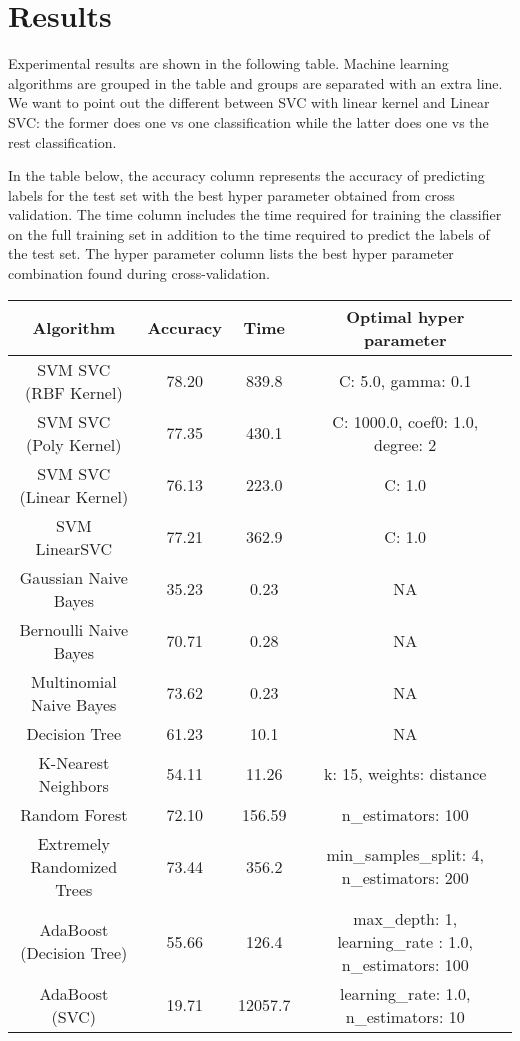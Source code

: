 \section{Results}

Experimental results are shown in the following table. Machine
learning algorithms are grouped in the table and groups are separated
with an extra line. We want to point out the different between SVC
with linear kernel and Linear SVC: the former does one vs one
classification while the latter does one vs the rest classification. 

In the table below, the accuracy column represents the accuracy of
predicting labels for the test set with the best hyper parameter
obtained from cross validation. The time column includes the time
required for training the classifier on the full training set in
addition to the time required to predict the labels of the test
set. The hyper parameter column lists the best hyper parameter
combination found during cross-validation. 

\begin{center}
	\begin{tabular}{c|c|c|c}
    \hline
	     Algorithm   & Accuracy & Time & Optimal hyper parameter\\
         \hline
         SVM SVC (RBF Kernel)   & 78.20  & 839.8 & C: 5.0, gamma: 0.1\\
         \hline
         SVM SVC (Poly Kernel)  & 77.35  & 430.1 & C: 1000.0, coef0: 1.0, degree: 2\\
         \hline
         SVM SVC (Linear Kernel)   &  76.13  & 223.0 & C: 1.0\\
         \hline
         SVM LinearSVC    &  77.21   &362.9  & C: 1.0\\
         \hline
         \hline
         Gaussian Naive Bayes & 35.23 & 0.23 & NA \\
         \hline
         Bernoulli Naive Bayes &   70.71    & 0.28  & NA \\
         \hline
         Multinomial Naive Bayes & 73.62 	& 0.23  & NA \\
         \hline
         \hline
         Decision Tree &  61.23 & 10.1 & NA \\
         \hline
         \hline
         K-Nearest Neighbors & 54.11 & 11.26 & k: 15, weights:  distance\\
         \hline
         \hline
         Random Forest & 72.10 & 156.59 & n\_estimators: 100\\
         \hline
         Extremely Randomized Trees & 73.44 & 356.2 &
         min\_samples\_split: 4,
         n\_estimators: 200 \\
         \hline
         AdaBoost (Decision Tree) & 55.66 & 126.4 & max\_depth: 1, learning\_rate : 1.0, n\_estimators: 100\\
         \hline
         AdaBoost (SVC) & 19.71 & 12057.7 & learning\_rate: 1.0,
         n\_estimators: 10\\
         \hline
          \end{tabular}
\end{center}
